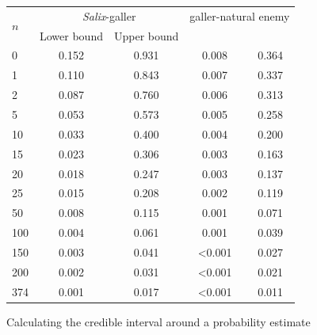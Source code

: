\documentclass[12pt]{article}
\begin{document}
\begin{floatbox}{}
        \begin{tabular}{l  c c  c c }
        \multirow{2}{*}{$n$} & \multicolumn{2}{c}{\emph{Salix}-galler} & \multicolumn{2}{c}{galler-natural enemy}\\
         & Lower bound & Upper bound \\
        \hline
        0   & 0.152 & 0.931 & 0.008 & 0.364 \\
        1   & 0.110 & 0.843 & 0.007 & 0.337 \\
        2   & 0.087 & 0.760 & 0.006 & 0.313 \\
        5   & 0.053 & 0.573 & 0.005 & 0.258 \\
        10  & 0.033 & 0.400 & 0.004 & 0.200 \\
        15  & 0.023 & 0.306 & 0.003 & 0.163 \\
        20  & 0.018 & 0.247 & 0.003 & 0.137 \\
        25  & 0.015 & 0.208 & 0.002 & 0.119 \\
        50  & 0.008 & 0.115 & 0.001 & 0.071 \\
        100 & 0.004 & 0.061 & 0.001 & 0.039 \\
        150 & 0.003 & 0.041 & \textless0.001 & 0.027 \\
        200 & 0.002 & 0.031 & \textless0.001 & 0.021 \\
        \hline
        374 & 0.001 & 0.017 & \textless0.001 & 0.011 \\
        \hline
        \end{tabular}

  \caption{Calculating the credible interval around a probability estimate}
  \label{box2}
\end{floatbox}
\end{document}
